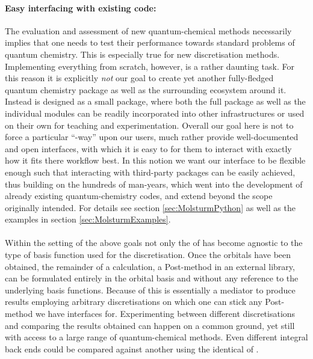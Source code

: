 \paragraph{Easy interfacing with existing code:}
The evaluation and assessment of new quantum-chemical methods
necessarily implies that one needs to test their performance
towards standard problems of quantum chemistry.
This is especially true for new discretisation methods.
Implementing everything from scratch,
however, is a rather daunting task.
For this reason it is explicitly \emph{not} our goal
to create yet another fully-fledged quantum chemistry package
as well as the surrounding ecosystem around it.
Instead \molsturm is designed as a small package,
where both the full package as well as the individual modules
can be readily incorporated into other infrastructures
or used on their own for teaching and experimentation.
Overall our goal here is not to force a particular ``\molsturm-way'' upon
our users,
much rather provide well-documented and open interfaces,
with which it is easy to for them to interact with \molsturm
exactly how it fits there workflow best.
In this notion we want our \molsturm interface 
to be flexible enough such that interacting
with third-party packages can be easily achieved,
thus building on the hundreds of man-years,
which went into the development of already existing quantum-chemistry codes,
and extend \molsturm beyond the scope originally intended.
For details see section \vref{sec:MolsturmPython}
as well as the examples in section \vref{sec:MolsturmExamples}.

\paragraph*{}
Within the setting of the above goals not only the \SCF of \molsturm
has become agnostic to the type of basis function used for the discretisation.
Once the \SCF orbitals have been obtained,
the remainder of a calculation, \eg a Post-\HF method in an external library,
can be formulated entirely in the \SCF orbital basis
and without any reference to the underlying basis functions.
Because of this \molsturm is essentially a mediator
to produce \SCF results employing arbitrary discretisations
on which one can stick any Post-\HF method we have interfaces for.
Experimenting between different discretisations
and comparing the results obtained can happen on a common ground,
yet still with access to a large range of quantum-chemical methods.
Even different integral back ends
could be compared against another using the identical \SCF of \molsturm.

